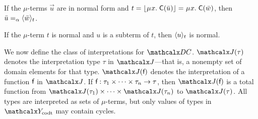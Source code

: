 \begin{rep}
\begin{lemma}
\label{lem:mu-norm-arg}
If the $\mu$-terms $\vec u$ are in normal form and $t = \nf{\MU x.\; \const{C}( \vec u )} = \MU x.\; \const{C}( \vec w )$,
then $\vec u \vsim \expand{t}{\vec w}$\vthinspace.
\end{lemma}

\begin{lemma}
\label{lem:mu-norm-interp}
If the $\mu$-term $t$ is normal and $u$ is a subterm of $t$, then $\expand{t}{u}$ is normal.
\end{lemma}

\end{rep}

We now define the class of interpretations for $\thD$.
$\interp{\J}{\tau}$ denotes the interpretation type $\tau$ in $\J$---that is, a
nonempty set of domain elements for that type.
$\interp{\J}{\const{f}}$ denotes the interpretation of a function $\const{f}$ in $\J$.
If $\const{f} : \tau_1 \times \cdots \times \tau_n \to \tau$,
then $\interp{\J}{\const{f}}$ is a total function from $\interp{\J}{\tau_1} \times \cdots \times \interp{\J}{\tau_n}$ to $\interp{\J}{\tau}$.
All types are interpreted as sets of $\mu$-terms, but
only values of types in $\Codata$ may contain cycles.

